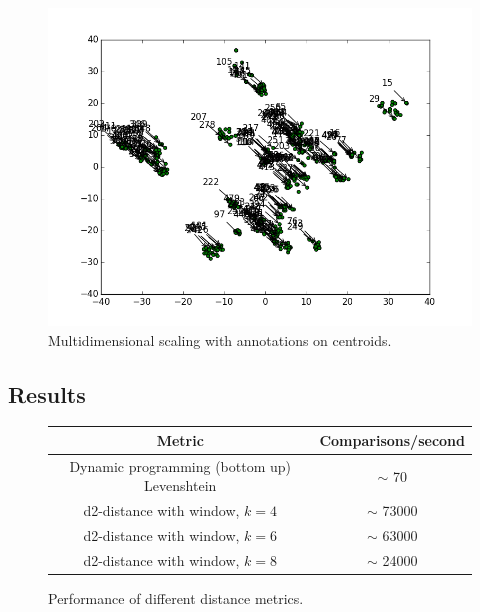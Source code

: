 \begin{figure}[h!]
  \centering
  \includegraphics[width=\textwidth]{graphics/MDS_t-SNE_SILVA_500.png}
  \caption{Multidimensional scaling with annotations on centroids.}
  \label{fig:mds_tsne}
\end{figure}


\subsection{Results}
\begin{figure}[H]
  \centering
  \begin{tabular}{ c | c }
    Metric                                        & Comparisons/second      \\
    \hline \hline
    Dynamic programming (bottom up) Levenshtein   & $\sim$ 70               \\
    \hline
    d2-distance with window, $k=4$                & $\sim$ 73000            \\
    \hline
    d2-distance with window, $k=6$                & $\sim$ 63000            \\
    \hline
    d2-distance with window, $k=8$                & $\sim$ 24000            \\
  \end{tabular}
  \caption{Performance of different distance metrics.}
\end{figure}

